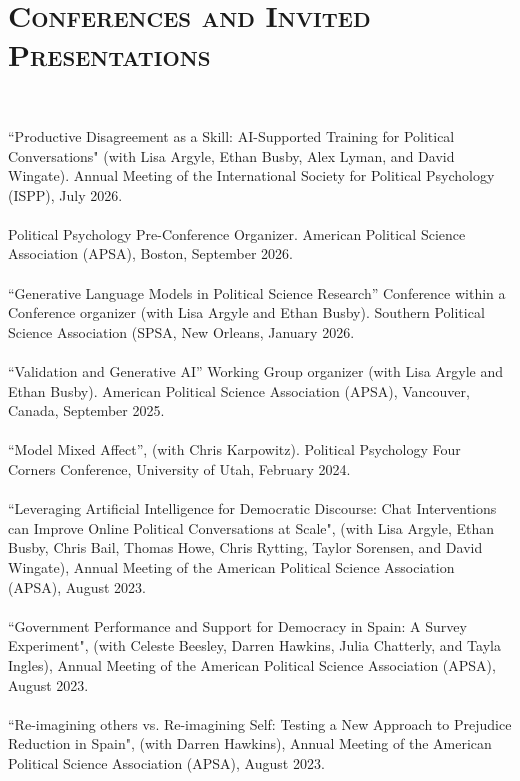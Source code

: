 \documentclass[10pt]{article}
\begin{document}
\section{\textsc{Conferences and Invited Presentations}}
\ \\  
\raggedright 
``Productive Disagreement as a Skill: AI-Supported Training for Political Conversations" (with Lisa Argyle, Ethan Busby, Alex Lyman, and David Wingate). Annual Meeting of the International Society for Political Psychology (ISPP), July 2026.\\
\ \\
Political Psychology Pre-Conference Organizer. American Political Science Association (APSA), Boston, September 2026. \\
\ \\
``Generative Language Models in Political Science Research'' Conference within a Conference organizer (with Lisa Argyle and Ethan Busby). Southern Political Science Association (SPSA, New Orleans, January 2026.\\
\ \\
``Validation and Generative AI'' Working Group organizer (with Lisa Argyle and Ethan Busby). American Political Science Association (APSA), Vancouver, Canada, September 2025.\\
\ \\
``Model Mixed Affect'', (with Chris Karpowitz). Political Psychology Four Corners Conference, University of Utah, February 2024.\\
\ \\
``Leveraging Artificial Intelligence for Democratic Discourse: Chat Interventions can Improve Online Political Conversations at Scale", (with Lisa Argyle, Ethan Busby, Chris Bail, Thomas Howe, Chris Rytting, Taylor Sorensen, and David Wingate), Annual Meeting of the American Political Science Association (APSA), August 2023.\\
\ \\
``Government Performance and Support for Democracy in Spain: A Survey Experiment", (with Celeste Beesley, Darren Hawkins, Julia Chatterly, and Tayla Ingles), Annual Meeting of the American Political Science Association (APSA), August 2023.\\
\ \\
``Re-imagining others vs. Re-imagining Self: Testing a New Approach to Prejudice Reduction in Spain", (with Darren Hawkins), Annual Meeting of the American Political Science Association (APSA), August 2023.\\
\ \\
\end{document}
